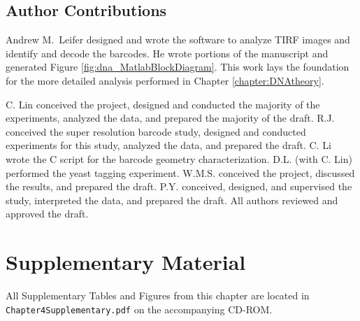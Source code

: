 \subsection{Author Contributions}
Andrew M.~Leifer designed and wrote the software to analyze TIRF images and identify and decode the barcodes. He wrote portions of the manuscript and generated Figure \ref{fig:dna_MatlabBlockDiagram}. This work lays the foundation for the more detailed analysis performed in Chapter \ref{chapter:DNAtheory}.

C. Lin conceived the project, designed and conducted the majority of the experiments, 
analyzed the data, and prepared the majority of the draft. R.J. conceived the super 
resolution barcode study, designed and conducted experiments for this study, analyzed 
the data, and prepared the draft. C. Li wrote the C script for the barcode 
geometry characterization. D.L. (with C. Lin) performed the yeast tagging experiment. 
W.M.S. conceived the project, discussed the results, and prepared the draft. P.Y. 
conceived, designed, and supervised the study, interpreted the data, and prepared the 
draft. All authors reviewed and approved the draft. 


\section{Supplementary Material}
 All Supplementary Tables and Figures from this chapter are located in \texttt{Chapter4Supplementary.pdf} on the accompanying CD-ROM. 